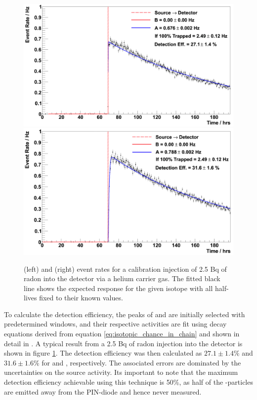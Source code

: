 \begin{figure}[b!]
    \centering
    \includegraphics[scale=0.23]{Chapter_4/Figures/Po_218_Calibration.png}
    \includegraphics[scale=0.23]{Chapter_4/Figures/Po_214_Calibration.png}
    \caption[\PoTOE{} and \PoTOF{} event rates for a calibration injection of 2.5 Bq of radon into the detector via a helium carrier gas.]
    {\PoTOE{} (left) and \PoTOF{} (right) event rates for a calibration injection of 2.5 Bq of radon into the detector via a helium carrier gas. The fitted black line shows the expected response for the given isotope with all half-lives fixed to their known values.}
    \label{fig:calibration_decay_fit}
\end{figure}
%

To calculate the detection efficiency, the peaks of \PoTOE{} and \PoTOF{} are initially selected with predetermined windows, and their respective activities are fit using decay equations derived from equation \ref{eq:isotopic_chance_in_chain} and shown in detail in \cite{mott_2013}. A typical result from a 2.5 Bq of radon injection into the detector is shown in figure \ref{fig:calibration_decay_fit}. The detection efficiency was then calculated as $27.1\pm1.4\%$ and $31.6\pm1.6\%$ for \PoTOE{} and \PoTOF{}, respectively. The associated errors are dominated by the uncertainties on the source activity. Its important to note that the maximum detection efficiency achievable using this technique is 50\%, as half of the \alpha{}-particles are emitted away from the PIN-diode and hence never measured. 


